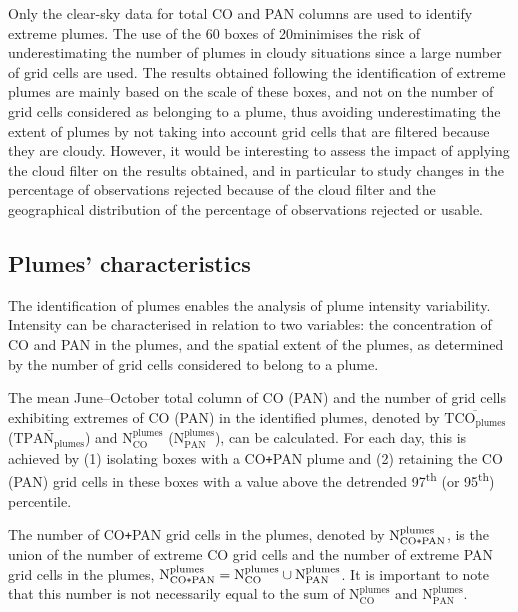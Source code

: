 \documentclass[acp, manuscript]{copernicus}
\begin{document}
Only the clear-sky data for total CO and PAN columns are used to identify extreme plumes. The use of the 60 boxes of 20\textdegree {}\textdegree minimises the risk of underestimating the number of plumes in cloudy situations since a large number of grid cells are used. The results obtained following the identification of extreme plumes are mainly based on the scale of these boxes, and not on the number of grid cells considered as belonging to a plume, thus avoiding underestimating the extent of plumes by not taking into account grid cells that are filtered because they are cloudy. However, it would be interesting to assess the impact of applying the cloud filter on the results obtained, and in particular to study changes in the percentage of observations rejected because of the cloud filter and the geographical distribution of the percentage of observations rejected or usable.



\subsection{Plumes' characteristics}\label{plumes_charac_chap4}


The identification of plumes enables the analysis of plume intensity variability. Intensity can be characterised in relation to two variables: the concentration of CO and PAN in the plumes, and the spatial extent of the plumes, as determined by the number of grid cells considered to belong to a plume.

The mean June--October total column of CO (PAN) and the number of grid cells exhibiting extremes of CO (PAN) in the identified plumes, denoted by $\overline{\text{TCO}_{\text{plumes}}}$ ($\overline{\text{TPAN}_{\text{plumes}}}$) and $\text{N}_{\text{CO}}^{\text{plumes}}$ ($\text{N}_{\text{PAN}}^{\text{plumes}}$), can be calculated. For each day, this is achieved by (1) isolating boxes with a CO\texttt{+}PAN plume and (2) retaining the CO (PAN) grid cells in these boxes with a value above the detrended 97\textsuperscript{th} (or 95\textsuperscript{th}) percentile.

The number of CO\texttt{+}PAN grid cells in the plumes, denoted by $\text{N}_{\text{CO\texttt{+}PAN}}^{\text{plumes}}$, is the union of the number of extreme CO grid cells and the number of extreme PAN grid cells in the plumes, $\text{N}_{\text{CO\texttt{+}PAN}}^{\text{plumes}}=\text{N}_{\text{CO}}^{\text{plumes}}\cup\text{N}_{\text{PAN}}^{\text{plumes}}$. It is important to note that this number is not necessarily equal to the sum of $\text{N}_{\text{CO}}^{\text{plumes}}$ and $\text{N}_{\text{PAN}}^{\text{plumes}}$.
\end{document}
